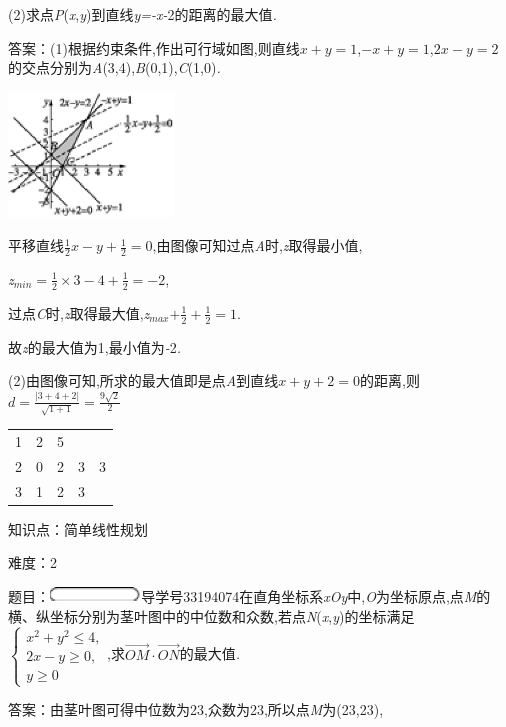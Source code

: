 \documentclass{article} %
\begin{document}
 (2)求点\textit{P}(\textit{x},\textit{y})到直线\textit{y=-x-}2的距离的最大值\textit{.}

 答案：(1)根据约束条件,作出可行域如图,则直线$x+y=1$,$-x+y=1$,$2x-y=2$的交点分别为\textit{A}(3,4),\textit{B}(0,1),\textit{C}(1,0)\textit{.}

 \includegraphics*[width=1.74in, height=1.31in, keepaspectratio=false]{image1675}

平移直线$\frac{1}{2}x-y+\frac{1}{2}=0$,由图像可知过点\textit{A}时,\textit{z}取得最小值,

\textit{z}${}_{min}$$=\frac{1}{2}\times3-4+\frac{1}{2}=-2$,

过点\textit{C}时,\textit{z}取得最大值,\textit{z}${}_{max}$$+\frac{1}{2}+\frac{1}{2}=1$.

故\textit{z}的最大值为1,最小值为\textit{-}2\textit{.}

(2)由图像可知,所求的最大值即是点\textit{A}到直线$x+y+2=0$的距离,则$d=\frac{|3+4+2|}{\sqrt{1+1}}=\frac{9\sqrt{2}}{2}$

 
\begin{tabular}{c|cccc}
	
	1&2&5& & \\
	2&0&2&3&3\\
	3&1&2&3& 
	
\end{tabular}

知识点：简单线性规划

难度：2

题目：\includegraphics*[width=0.95in, height=0.16in, keepaspectratio=false]{image1683}导学号33194074在直角坐标系\textit{xOy}中,\textit{O}为坐标原点,点\textit{M}的横、纵坐标分别为茎叶图中的中位数和众数,若点\textit{N}(\textit{x},\textit{y})的坐标满足$
\begin{cases}
x^2+y^2 \le 4,\\
2x-y\ge 0,\\
y\ge 0
\end{cases}$,求$\vec{OM}\cdot\vec{ON}$的最大值\textit{.}

 答案：由茎叶图可得中位数为23,众数为23,所以点\textit{M}为(23,23),
\end{document}
